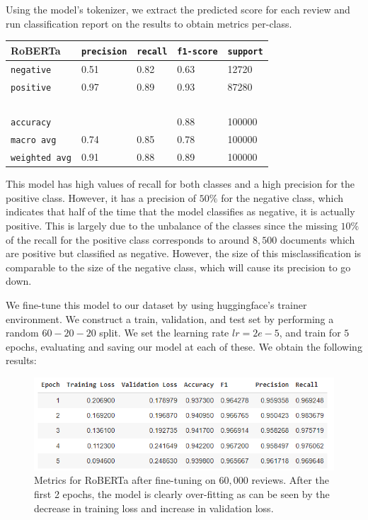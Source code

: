 \documentclass[a4paper,10pt, openright]{article}
\begin{document}
Using the model's tokenizer, we extract the predicted score for each review and run classification report on the results to obtain metrics per-class. 

\begin{table}[!ht]
	\centering
	\begin{tabular}{|l|l|l|l|l|}
		\hline
		RoBERTa & \texttt{precision} & \texttt{recall} & \texttt{f1-score} & \texttt{support} \\ \hline
		\texttt{negative} & 0.51 & 0.82 & 0.63 & 12720 \\ 
		\texttt{positive} & 0.97 & 0.89 & 0.93 & 87280 \\
		~ & ~ & ~ & ~ & ~ \\
		\texttt{accuracy} & ~ & ~ & 0.88 & 100000 \\ 
		\texttt{macro avg} & 0.74 & 0.85 & 0.78 & 100000 \\ 
		\texttt{weighted avg} & 0.91 & 0.88 & 0.89 & 100000 \\ \hline
	\end{tabular}
\end{table}

This model has high values of recall for both classes and a high precision for the positive class. However, it has a precision of $50\%$ for the negative class, which indicates that half of the time that the model classifies as negative, it is actually positive. This is largely due to the unbalance of the classes since the missing $10\%$ of the recall for the positive class corresponds to around $8,500$ documents which are positive but classified as negative. However, the size of this misclassification is comparable to the size of the negative class, which will cause its precision to go down.

We fine-tune this model to our dataset by using huggingface's trainer\cite{fifthbib} environment. We construct a train, validation, and test set by performing a random $60-20-20$ split. We set the learning rate $lr = 2e-5$, and train for $5$ epochs, evaluating and saving our model at each of these. We obtain the following results: 

\begin{figure}[H]
	\begin{center}
		\includegraphics[width=16 cm, height=5 cm]{./Images/finetuning.png}
		\caption{Metrics for RoBERTa after fine-tuning on $60,000$ reviews. After the first 2 epochs, the model is clearly over-fitting as can be seen by the decrease in training loss and increase in validation loss.}
		\label{fig:robertaft}
	\end{center}
\end{figure}
\end{document}
